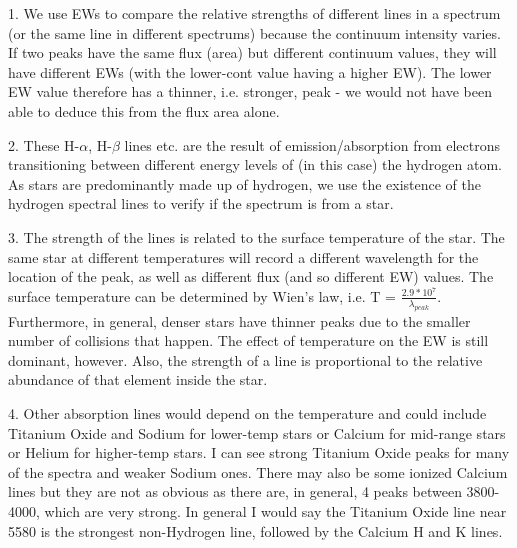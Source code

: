 1. We use EWs to compare the relative strengths of different lines in a spectrum (or the same line in different spectrums) because the continuum intensity varies. If two peaks have the same flux (area) but different continuum values, they will have different EWs (with the lower-cont value having a higher EW). The lower EW value therefore has a thinner, i.e. stronger, peak - we would not have been able to deduce this from the flux area alone.

2. These H-$\alpha$, H-$\beta$ lines etc. are the result of emission/absorption from electrons transitioning between different energy levels of (in this case) the hydrogen atom. As stars are predominantly made up of hydrogen, we use the existence of the hydrogen spectral lines to verify if the spectrum is from a star.

3. The strength of the lines is related to the surface temperature of the star. The same star at different temperatures will record a different wavelength for the location of the peak, as well as different flux (and so different EW) values. The surface temperature can be determined by Wien's law, i.e.
T = $ \frac{2.9*10^7}{\lambda_{peak}} $. Furthermore, in general, denser stars have thinner peaks due to the smaller number of collisions that happen. The effect of temperature on the EW is still dominant, however. Also, the strength of a line is proportional to the relative abundance of that element inside the star.

4. Other absorption lines would depend on the temperature and could include Titanium Oxide and Sodium for lower-temp stars or Calcium for mid-range stars or Helium for higher-temp stars. I can see strong Titanium Oxide peaks for many of the spectra and weaker Sodium ones. There may also be some ionized Calcium lines but they are not as obvious as there are, in general, 4 peaks between 3800-4000, which are very strong. In general I would say the Titanium Oxide line near 5580 is the strongest non-Hydrogen line, followed by the Calcium H and K lines.

